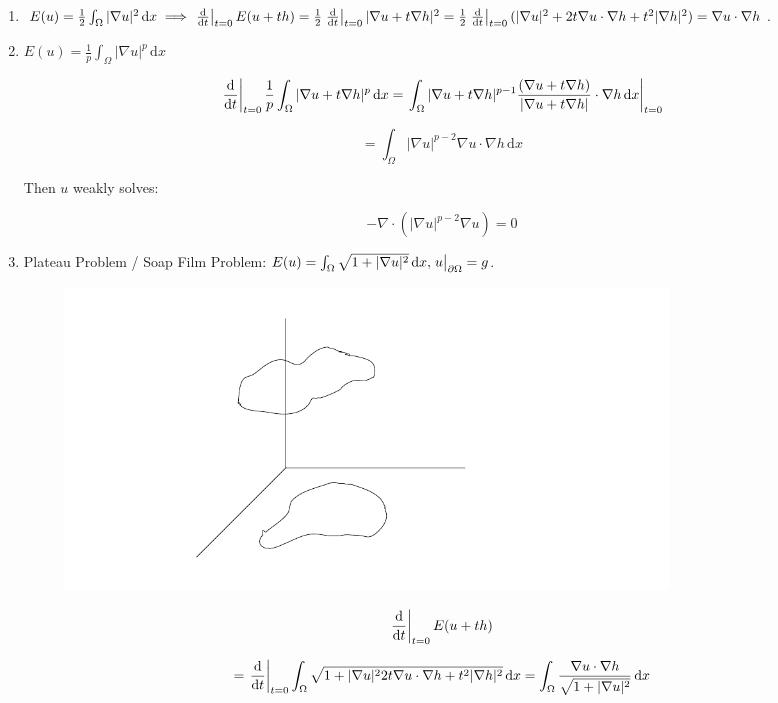 \documentclass{article}
\theoremstyle{definition}
\begin{document}
\begin{enumerate}[label=\roman*)]
    \item \(E(u) = \frac{1}{2}\int_{\Omega} \vert \nabla u \vert ^2 \,\mathrm{d}x \implies \eval{\frac{\mathrm{d}}{\mathrm{d}t}}_{t=0} E(u+th) = \frac{1}{2}\eval{\frac{\mathrm{d}}{\mathrm{d}t}}_{t=0} \vert\nabla u + t \nabla h\vert^2 = \frac{1}{2}\eval{\frac{\mathrm{d}}{\mathrm{d}t}}_{t=0} (\vert \nabla u \vert^2 + 2 t \nabla u \cdot \nabla h + t^2 \vert \nabla h \vert^2) = \nabla u \cdot \nabla h\).
    \item \(E(u) = \frac{1}{p} \int_{\Omega} \vert \nabla u \vert^p \,\mathrm{d}x\)
    
    \[
        \eval{\frac{\mathrm{d}}{\mathrm{d}t}}_{t=0} \frac{1}{p} \int_{\Omega} \vert \nabla u + t \nabla h \vert ^p \,\mathrm{d}x = \eval{\int_{\Omega} \vert \nabla u + t\nabla h \vert ^{p-1} \frac{(\nabla u + t\nabla h)}{\vert \nabla u + t\nabla h \vert} \cdot\nabla h \,\mathrm{d}x }_{t=0}
    \]

    \[
        = \int_{\Omega} \vert \nabla u \vert ^{p-2} \nabla u \cdot \nabla h \,\mathrm{d}x 
    \]

    Then \(u\) weakly solves:

    \[
        - \nabla \cdot \left( \vert \nabla u \vert ^{p-2} \nabla u \right) = 0
    \]

    \item Plateau Problem / Soap Film Problem: \(E(u) = \int_{\Omega} \sqrt{1 + \vert \nabla u \vert ^2} \,\mathrm{d}x, \eval{u}_{\partial \Omega} = g\).
    

    \begin{figure}[H]
        \centering
        \includegraphics[width=0.8\textwidth]{img/graph}
        \caption{}
        \label{fig:graph}
    \end{figure}

    \[
        \eval{\frac{\mathrm{d}}{\mathrm{d}t}}_{t=0} E(u+th)
    \]

    \[
        = \eval{\frac{\mathrm{d}}{\mathrm{d}t}}_{t=0} \int_{\Omega} \sqrt{1 + \vert \nabla u \vert^2  2 t \nabla u \cdot \nabla h + t^2 \vert \nabla h \vert^2} \,\mathrm{d}x = \int_{\Omega} \frac{\nabla u \cdot \nabla h}{\sqrt{1+\vert \nabla u \vert^2}} \,\mathrm{d}x 
    \]


\end{enumerate}
\end{document}
